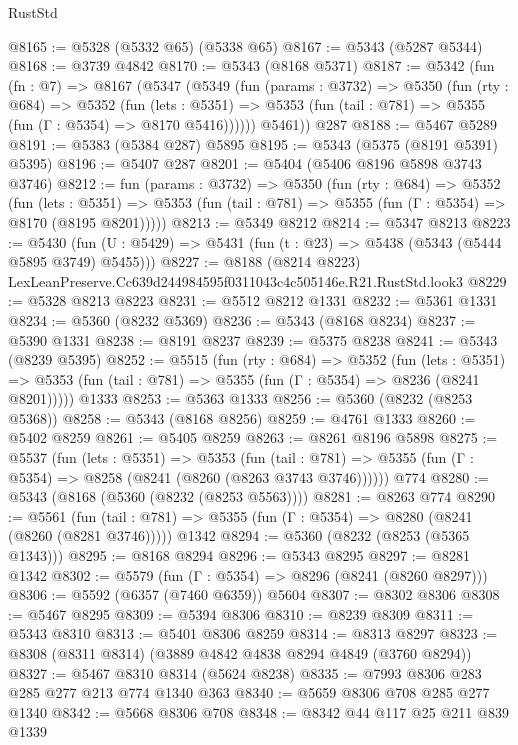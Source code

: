 \begin{lexlean}{RustStd}
\begin{coremodule}
@8165 := @5328 (@5332 @65) (@5338 @65)
@8167 := @5343 (@5287 @5344)
@8168 := @3739 @4842
@8170 := @5343 (@8168 @5371)
@8187 := @5342
    (fun (fn : @7) =>
    @8167
      (@5347
        (@5349
          (fun (params : @3732) =>
          @5350
            (fun (rty : @684) =>
            @5352
              (fun (lets : @5351) =>
              @5353 (fun (tail : @781) => @5355 (fun (Γ : @5354) => @8170 @5416))))))
        @5461))
    @287
@8188 := @5467 @5289
@8191 := @5383 (@5384 @287) @5895
@8195 := @5343 (@5375 (@8191 @5391) @5395)
@8196 := @5407 @287
@8201 := @5404 (@5406 @8196 @5898 @3743 @3746)
@8212 := fun (params : @3732) =>
  @5350
    (fun (rty : @684) =>
    @5352
      (fun (lets : @5351) =>
      @5353 (fun (tail : @781) => @5355 (fun (Γ : @5354) => @8170 (@8195 @8201)))))
@8213 := @5349 @8212
@8214 := @5347 @8213
@8223 := @5430 (fun (U : @5429) => @5431 (fun (t : @23) => @5438 (@5343 (@5444 @5895 @3749) @5455)))
@8227 := @8188 (@8214 @8223) LexLeanPreserve.Cc639d244984595f0311043c4c505146e.R21.RustStd.look3
@8229 := @5328 @8213 @8223
@8231 := @5512 @8212 @1331
@8232 := @5361 @1331
@8234 := @5360 (@8232 @5369)
@8236 := @5343 (@8168 @8234)
@8237 := @5390 @1331
@8238 := @8191 @8237
@8239 := @5375 @8238
@8241 := @5343 (@8239 @5395)
@8252 := @5515
    (fun (rty : @684) =>
    @5352
      (fun (lets : @5351) =>
      @5353 (fun (tail : @781) => @5355 (fun (Γ : @5354) => @8236 (@8241 @8201)))))
    @1333
@8253 := @5363 @1333
@8256 := @5360 (@8232 (@8253 @5368))
@8258 := @5343 (@8168 @8256)
@8259 := @4761 @1333
@8260 := @5402 @8259
@8261 := @5405 @8259
@8263 := @8261 @8196 @5898
@8275 := @5537
    (fun (lets : @5351) =>
    @5353
      (fun (tail : @781) => @5355 (fun (Γ : @5354) => @8258 (@8241 (@8260 (@8263 @3743 @3746))))))
    @774
@8280 := @5343 (@8168 (@5360 (@8232 (@8253 @5563))))
@8281 := @8263 @774
@8290 := @5561
    (fun (tail : @781) => @5355 (fun (Γ : @5354) => @8280 (@8241 (@8260 (@8281 @3746)))))
    @1342
@8294 := @5360 (@8232 (@8253 (@5365 @1343)))
@8295 := @8168 @8294
@8296 := @5343 @8295
@8297 := @8281 @1342
@8302 := @5579 (fun (Γ : @5354) => @8296 (@8241 (@8260 @8297)))
@8306 := @5592 (@6357 (@7460 @6359)) @5604
@8307 := @8302 @8306
@8308 := @5467 @8295
@8309 := @5394 @8306
@8310 := @8239 @8309
@8311 := @5343 @8310
@8313 := @5401 @8306 @8259
@8314 := @8313 @8297
@8323 := @8308 (@8311 @8314) (@3889 @4842 @4838 @8294 @4849 (@3760 @8294))
@8327 := @5467 @8310 @8314 (@5624 @8238)
@8335 := @7993 @8306 @283 @285 @277 @213 @774 @1340 @363
@8340 := @5659 @8306 @708 @285 @277 @1340
@8342 := @5668 @8306 @708
@8348 := @8342 @44 @117 @25 @211 @839 @1339

\end{coremodule}
\end{lexlean}
